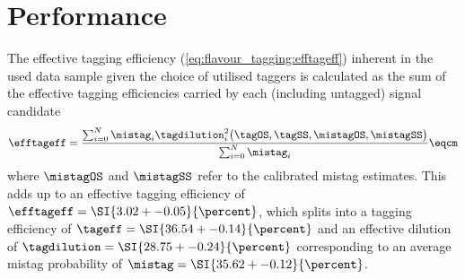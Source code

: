 \section{Performance}
\label{sec:flavour_tagging:performance}

The effective tagging efficiency (\cf \cref{eq:flavour_tagging:efftageff})
inherent in the used data sample given the choice of utilised taggers is
calculated as the sum of the effective tagging efficiencies carried by each
(including untagged) signal candidate
%
\begin{equation}
  \efftageff = \frac{\sum_{i=0}^{N} \mistag_i \tagdilution_i^2\big(\tagOS, \tagSS, \mistagOS, \mistagSS \big)}{\sum_{i=0}^{N} \mistag_i}\eqcm
\end{equation}
%
where $\mistagOS$ and $\mistagSS$ refer to the calibrated mistag estimates. This
adds up to an effective tagging efficiency of $\efftageff = \SI{3.02 +-
0.05}{\percent}$, which splits into a tagging efficiency of $\tageff = \SI{36.54
+- 0.14}{\percent}$ and an effective dilution of $\tagdilution = \SI{28.75 +-
0.24}{\percent}$ corresponding to an average mistag probability of $\mistag =
\SI{35.62 +- 0.12}{\percent}$.

